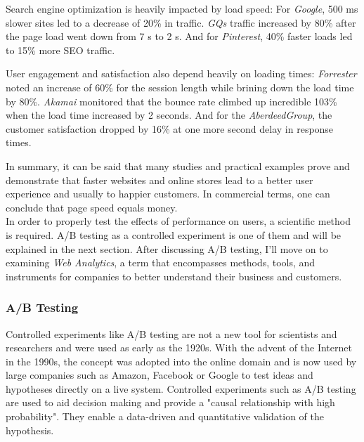 Search engine optimization is heavily impacted by load speed:
For \textit{Google}, 500 ms slower sites led to a decrease of 20\% in traffic.
\textit{GQs} traffic increased by 80\% after the page load went down from 7 s to 2 s.
And for \textit{Pinterest}, 40\% faster loads led to 15\% more SEO traffic.



User engagement and satisfaction also depend heavily on loading times:
\textit{Forrester} noted an increase of 60\% for the session length while brining down the load time by 80\%.
\textit{Akamai} monitored that the bounce rate climbed up incredible 103\% when the load time increased by 2 seconds.
And for the \textit{AberdeedGroup}, the customer satisfaction dropped by 16\% at one more second delay in response times.


In summary, it can be said that many studies and practical examples prove and demonstrate that faster websites and online stores lead to a better user experience and usually to happier customers.
In commercial terms, one can conclude that page speed equals money.
\\

In order to properly test the effects of performance on users, a scientific method is required.
A/B testing as a controlled experiment is one of them and will be explained in the next section.
After discussing A/B testing, I'll move on to examining \textit{Web Analytics}, a term that encompasses methods, tools, and instruments for companies to better understand their business and customers.


\subsubsection{A/B Testing}

Controlled experiments like A/B testing are not a new tool for scientists and researchers and were used as early as the 1920s.%
With the advent of the Internet in the 1990s, the concept was adopted into the online domain and is now used by large companies such as Amazon, Facebook or Google to test ideas and hypotheses directly on a live system.
Controlled experiments such as A/B testing are used to aid decision making and provide a "causal relationship with high probability". %
They enable a data-driven and quantitative validation of the hypothesis. %

